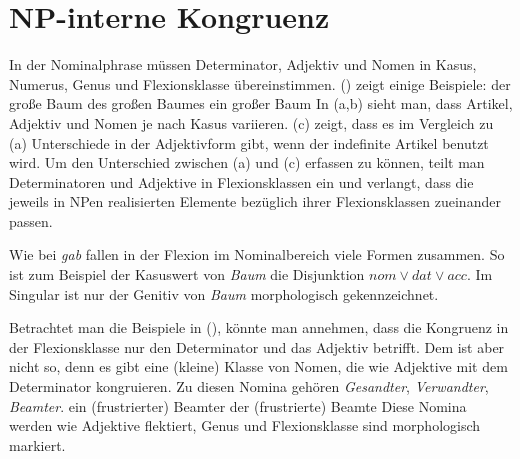\section{NP-interne Kongruenz}
\label{sec-np-kongruenz}

In
der Nominalphrase müssen Determinator, Adjektiv und Nomen in Kasus, Numerus, Genus 
und Flexionsklasse übereinstimmen. () zeigt einige Beispiele:
\eal
\ex der große  Baum
\ex des großen Baumes
\ex ein großer Baum
\zl
In (a,b) sieht man, dass Artikel, Adjektiv und Nomen je nach Kasus variieren. (c)
zeigt, dass es im Vergleich zu (a) Unterschiede in der Adjektivform gibt, wenn
der indefinite Artikel benutzt wird. Um den Unterschied zwischen (a) und (c)
erfassen zu können, teilt man Determinatoren und Adjektive in Flexionsklassen ein und
verlangt, dass die jeweils in NPen realisierten Elemente bezüglich ihrer Flexionsklassen
zueinander passen.

Wie bei \emph{gab} fallen in der Flexion im Nominalbereich viele Formen zusammen.
So ist zum Beispiel der Kasuswert von \emph{Baum} die Disjunktion
$nom \vee dat \vee acc$.
Im Singular ist nur der Genitiv von \emph{Baum} morphologisch gekennzeichnet.
\largerpage

Betrachtet man die Beispiele in (), könnte man annehmen, dass die Kongruenz
in der Flexionsklasse nur den Determinator und das Adjektiv betrifft. Dem ist aber nicht so,
denn es gibt eine (kleine) Klasse von Nomen, die wie Adjektive mit dem Determinator kongruieren.
Zu diesen Nomina gehören \emph{Gesandter}, \emph{Verwandter}, \emph{Beamter}.
\eal
\ex ein (frustrierter) Beamter
\ex der (frustrierte)  Beamte
\zl
Diese Nomina werden wie Adjektive flektiert, Genus und Flexionsklasse sind morphologisch markiert.


